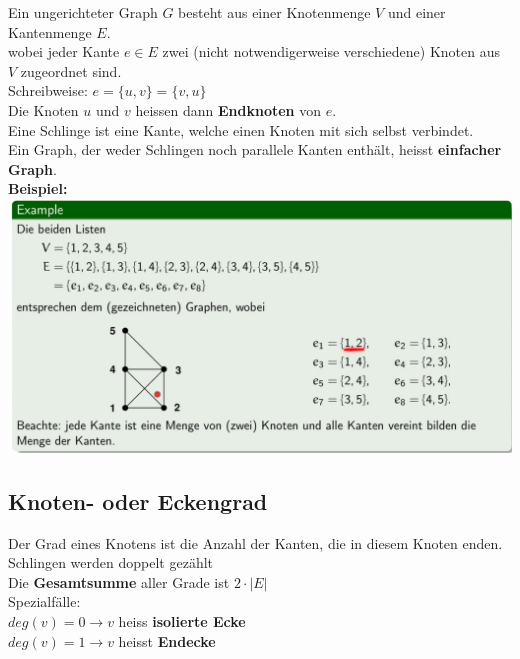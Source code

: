 \documentclass[12pt]{scrartcl}
\begin{document}
Ein ungerichteter Graph $G$ besteht aus einer Knotenmenge $V$ und einer Kantenmenge $E$.\\

wobei jeder Kante $e \in E$ zwei (nicht notwendigerweise verschiedene) Knoten aus $V$ zugeordnet sind.\\

Schreibweise: $e = \{u,v\} = \{v,u\}$\\
Die Knoten $u$ und $v$ heissen dann \textbf{Endknoten} von $e$.\\

Eine Schlinge ist eine Kante, welche einen Knoten mit sich selbst verbindet.\\

Ein Graph, der weder Schlingen noch parallele Kanten enthält, heisst \textbf{einfacher Graph}.\\


\textbf{Beispiel:}\\
\includegraphics[width=15cm]{img/graphentheorie_beispiel.png}\\



\newpage
\subsection{Knoten- oder Eckengrad}
Der Grad eines Knotens ist die Anzahl der Kanten, die in diesem Knoten enden. Schlingen werden doppelt gezählt\\
Die \textbf{Gesamtsumme} aller Grade ist $2 \cdot |E|$\\

Spezialfälle:\\
$deg(v) = 0 \rightarrow v$ heiss \textbf{isolierte Ecke}\\
$deg(v) = 1 \rightarrow v$ heisst \textbf{Endecke}\\
\end{document}
